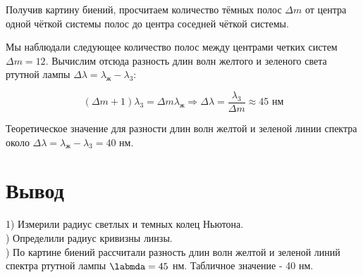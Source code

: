 Получив картину биений, просчитаем количество тёмных полос $\Delta m$ от центра одной чёткой системы полос до центра соседней чёткой системы.

Мы наблюдали следующее количество полос между центрами четких систем $\Delta m = 12$. Вычислим отсюда разность длин волн желтого и зеленого света ртутной лампы $\Delta \lambda = \lambda_{\text{ж}} - \lambda_{\text{3}}$:

$$
(\Delta m + 1)\lambda_{\text{3}} = \Delta m\lambda_{\text{ж}} \Rightarrow \Delta \lambda = \frac{\lambda_{\text{3}}}{\Delta m} \approx {45}{\text{ нм}}
$$

Теоретическое значение для разности длин волн желтой и зеленой линии спектра около $\Delta \lambda = \lambda_{\text{ж}} - \lambda_{\text{3}} = 40$ нм.


\section*{Вывод}
1) Измерили радиус светлых и темных колец Ньютона.\\) Определили радиус кривизны линзы. \\) По картине биений рассчитали разность длин волн желтой и зеленой линий спектра ртутной лампы $\labmda = 45$ нм. Табличное значение - 40 нм.

